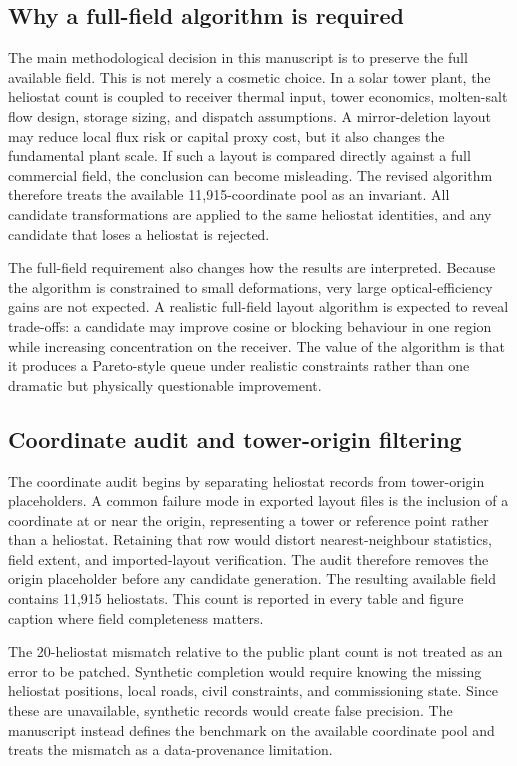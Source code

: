 \documentclass[final,3p,times]{elsarticle}
\begin{document}
\subsection{Why a full-field algorithm is required}
The main methodological decision in this manuscript is to preserve the full available field. This is not merely a cosmetic choice. In a solar tower plant, the heliostat count is coupled to receiver thermal input, tower economics, molten-salt flow design, storage sizing, and dispatch assumptions. A mirror-deletion layout may reduce local flux risk or capital proxy cost, but it also changes the fundamental plant scale. If such a layout is compared directly against a full commercial field, the conclusion can become misleading. The revised algorithm therefore treats the available 11,915-coordinate pool as an invariant. All candidate transformations are applied to the same heliostat identities, and any candidate that loses a heliostat is rejected.

The full-field requirement also changes how the results are interpreted. Because the algorithm is constrained to small deformations, very large optical-efficiency gains are not expected. A realistic full-field layout algorithm is expected to reveal trade-offs: a candidate may improve cosine or blocking behaviour in one region while increasing concentration on the receiver. The value of the algorithm is that it produces a Pareto-style queue under realistic constraints rather than one dramatic but physically questionable improvement.

\subsection{Coordinate audit and tower-origin filtering}
The coordinate audit begins by separating heliostat records from tower-origin placeholders. A common failure mode in exported layout files is the inclusion of a coordinate at or near the origin, representing a tower or reference point rather than a heliostat. Retaining that row would distort nearest-neighbour statistics, field extent, and imported-layout verification. The audit therefore removes the origin placeholder before any candidate generation. The resulting available field contains 11,915 heliostats. This count is reported in every table and figure caption where field completeness matters.

The 20-heliostat mismatch relative to the public plant count is not treated as an error to be patched. Synthetic completion would require knowing the missing heliostat positions, local roads, civil constraints, and commissioning state. Since these are unavailable, synthetic records would create false precision. The manuscript instead defines the benchmark on the available coordinate pool and treats the mismatch as a data-provenance limitation.
\end{document}
